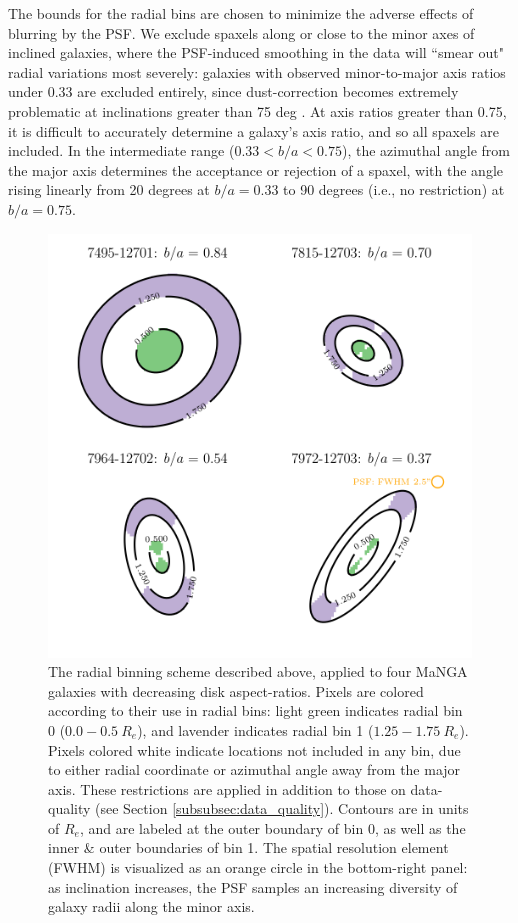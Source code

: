 The bounds for the radial bins are chosen to minimize the adverse effects of blurring by the PSF. We exclude spaxels along or close to the minor axes of inclined galaxies, where the PSF-induced smoothing in the data will ``smear out" radial variations most severely: galaxies with observed minor-to-major axis ratios under 0.33 are excluded entirely, since dust-correction becomes extremely problematic at inclinations greater than 75 deg \citep{pellegrini_2019_warpfield}. At axis ratios greater than 0.75, it is difficult to accurately determine a galaxy's axis ratio, and so all spaxels are included. In the intermediate range ($0.33 < b/a < 0.75$), the azimuthal angle from the major axis determines the acceptance or rejection of a spaxel, with the angle rising linearly from 20 degrees at $b/a = 0.33$ to 90 degrees (i.e., no restriction) at $b/a = 0.75$.

\begin{figure}
    \centering
    \includegraphics[width=5 in]{radial_bins}
    \caption[An illustration of the radial binning scheme used to compute radial metallicity decrements, along with azimuthal cuts excluding the minor axis.]{The radial binning scheme described above, applied to four MaNGA galaxies with decreasing disk aspect-ratios. Pixels are colored according to their use in radial bins: light green indicates radial bin 0 ($0.0 - 0.5~R_e$), and lavender indicates radial bin 1 ($1.25-1.75~R_e$). Pixels colored white indicate locations not included in any bin, due to either radial coordinate or azimuthal angle away from the major axis. These restrictions are applied in addition to those on data-quality (see Section \ref{subsubsec:data_quality}). Contours are in units of $R_e$, and are labeled at the outer boundary of bin 0, as well as the inner \& outer boundaries of bin 1. The spatial resolution element (FWHM) is visualized as an orange circle in the bottom-right panel: as inclination increases, the PSF samples an increasing diversity of galaxy radii along the minor axis.}
    \label{fig:radial_bins}
\end{figure}

